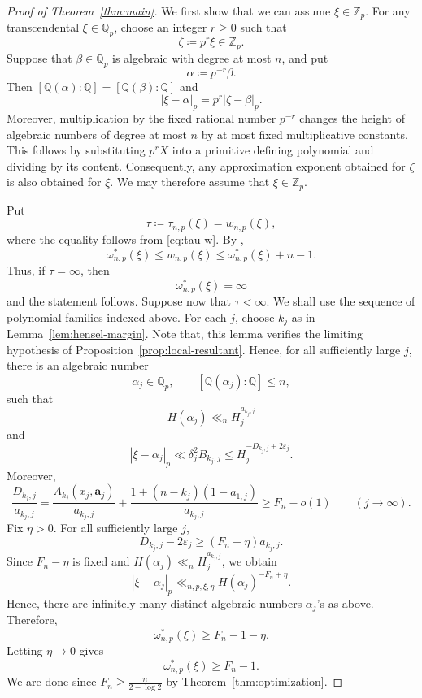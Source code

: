 \documentclass[10pt,a4paper]{amsart}
\newcommand{\Q}{\mathbb Q}
\newcommand{\Z}{\mathbb Z}
\newcommand{\Qp}{\mathbb Q_p}
\newcommand{\Zp}{\mathbb Z_p}
\begin{document}
\begin{proof}[Proof of Theorem~\ref{thm:main}]
We first show that we can assume $\xi\in\Z_p$. For any transcendental $\xi\in\Q_p$, choose an integer $r\geq0$ such that
$$
\zeta\coloneqq p^r\xi\in\Zp.
$$
Suppose that $\beta\in\Qp$ is algebraic with degree at most $n$, and put
$$
\alpha\coloneqq p^{-r}\beta.
$$
Then $[\Q(\alpha):\Q]=[\Q(\beta):\Q]$ and
$$
|\xi-\alpha|_p=p^r|\zeta-\beta|_p.
$$
Moreover, multiplication by the fixed rational number $p^{-r}$ changes the
height of algebraic numbers of degree at most $n$ by at most fixed
multiplicative constants. This follows by substituting $p^rX$ into a
primitive defining polynomial and dividing by its content. Consequently, any
approximation exponent obtained for $\zeta$ is also obtained for $\xi$.
We may therefore assume that $\xi\in\Zp$. 

Put
$$
\tau\coloneqq\tau_{n,p}(\xi)=w_{n,p}(\xi),
$$
where the equality follows from \eqref{eq:tau-w}. By
\cite[Theorem~9.3]{BugeaudBook},
$$
\omega^*_{n,p}(\xi)\leq w_{n,p}(\xi)
\leq\omega^*_{n,p}(\xi)+n-1.
$$
Thus, if $\tau=\infty$, then
$$
\omega^*_{n,p}(\xi)=\infty
$$
and the statement follows. Suppose now that $\tau<\infty$. We shall use the sequence of polynomial families indexed above. For each $j$, choose $k_j$
as in Lemma~\ref{lem:hensel-margin}. Note that, this lemma verifies the limiting
hypothesis of Proposition~\ref{prop:local-resultant}. Hence, for all
sufficiently large $j$, there is an algebraic number
$$
\alpha_j\in\Qp,
\qquad [\Q(\alpha_j):\Q]\leq n,
$$
such that
$$
H(\alpha_j)\ll_nH_j^{a_{k_j,j}}
$$
and
$$
|\xi-\alpha_j|_p
\ll
\delta_j^2B_{k_j,j}
\leq H_j^{-D_{k_j,j}+2\varepsilon_j}.
$$
Moreover,
$$
\frac{D_{k_j,j}}{a_{k_j,j}}
=
\frac{A_{k_j}(x_j,\mathbf a_j)}{a_{k_j,j}}
+
\frac{1+(n-k_j)(1-a_{1,j})}{a_{k_j,j}}
\geq F_n-o(1)\qquad(j\to\infty).
$$
Fix $\eta>0$. For all sufficiently large $j$,
$$
D_{k_j,j}-2\varepsilon_j\geq(F_n-\eta)a_{k_j,j}.
$$
Since $F_n-\eta$ is fixed and
$H(\alpha_j)\ll_nH_j^{a_{k_j,j}}$, we obtain
$$
|\xi-\alpha_j|_p
\ll_{n,p,\xi,\eta}
H(\alpha_j)^{-F_n+\eta}.
$$
Hence, there are infinitely many distinct algebraic numbers $\alpha_j$'s as above. Therefore,
$$
\omega^*_{n,p}(\xi)\geq F_n-1-\eta.
$$
Letting $\eta\to0$ gives
$$
\omega^*_{n,p}(\xi)\geq F_n-1.
$$
We are done since $F_n\geq \frac{n}{2-\log 2}$ by Theorem~\ref{thm:optimization}.
\end{proof}
\end{document}

